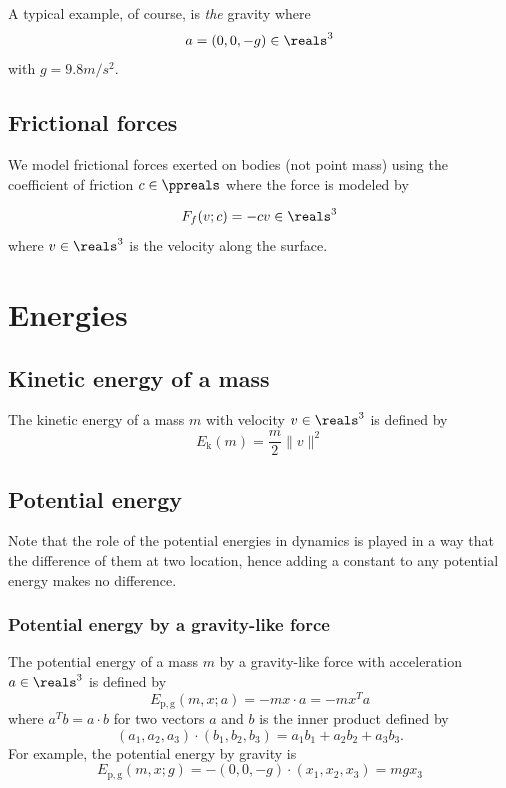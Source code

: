\documentclass{article}
\begin{document}
A typical example, of course, is \emph{the} gravity where
\[
	a = (0,0,-g)
	\in\reals^3
\]
with $g = 9.8 m/s^2$.

\subsection{Frictional forces}
\label{subsection:frictional-forces}

We model frictional forces exerted on bodies (not point mass)
using the coefficient of friction $c\in\ppreals$ where the force is modeled by

\begin{equation}
\label{eq:force:frictional}
F_f(v;c) = -c v
	\in\reals^3
\end{equation}
where $v\in\reals^3$ is the velocity along the surface.

\section{Energies}

\subsection{Kinetic energy of a mass}

The kinetic energy of a mass $m$ with velocity $v\in\reals^3$
is defined by
\begin{equation}
\label{eq:energy:kinetic}
	E_\mathrm{k}(m) = \frac{m}{2} \|v\|^2
\end{equation}

\subsection{Potential energy}

Note that the role of the potential energies in dynamics
is played in a way that the difference of them at two location,
hence adding a constant to any potential energy
makes no difference.

\subsubsection{Potential energy by a gravity-like force}

The potential energy of a mass $m$ by a gravity-like force with acceleration $a\in\reals^3$
is defined by
\begin{equation}
\label{eq:energy:potential:gravity-like}
E_\mathrm{p,g}(m,x;a)
=  - m x\cdot a
= - m x^Ta
\end{equation}
where $a^Tb = a\cdot b$ for two vectors $a$ and $b$
is the inner product defined by
\[
	(a_1,a_2,a_3) \cdot (b_1,b_2,b_3) = a_1b_1 + a_2b_2 + a_3b_3.
\]
For example, the potential energy by gravity is
\[
	E_\mathrm{p,g}(m,x;g)
	= -(0,0,-g) \cdot (x_1,x_2,x_3)
	=  mgx_3
\]
\end{document}
